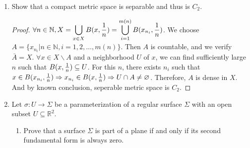 \documentclass{article}
\def\emptyset{\varnothing}
\begin{document}
\begin{enumerate}
\begin{proof}
\begin{enumerate}[label=(\alph*)]
Consider a rational point $p$ and a closed set $S$. Suppose $U\backslash A$ is an open neighborhood containing $p$, then all rational points within $U$ are in this set. Take an irrational number $q$ from $U$. For any open neighborhood $Y\backslash B$ containing $S$, $q\in Y$, where $Y$ is open in $\mathbb{R}$.  We can find a rational number within $Y$, sufficiently close to $q$ such that this rational number is also in $U$. Therefore $(U\backslash A)\cap (V\backslash B) \neq \emptyset$ and the topology defined in this problem is not $T_3$.
\item Let $\mathcal{N} = \{ \{x\}\cup B(x,{1\over n})\backslash S,n=1,2,\dots\}$. For a neighborhood $ U\backslash A $ of $ x $, we can find sufficiently large $n$ such that $B(x,{1\over n})\subseteq U \Rightarrow \{x\} \cup B(x,{1\over n})\backslash Q^c \subseteq U\backslash A $. Therefore, $(X,T)$ is $C_1$.
\item $\forall S_1\subset S,S_1 = S\cap (\mathbb{R}\backslash(S\backslash S_1))$ is open  in $S$. Thus $S$ has discrete topology. Each single point set is open. Therefore the accumulated point set of $A$ is empty. $\bar{A}=S\Rightarrow A=S$ and $A$ is uncountable. Hence $S$ cannot be separable. 
\item Assume $(X,T)$ is $C_2$, then $(S,T)$ is $C_2$. $C_2$ space is separable, a contradiction. 
\end{enumerate}
\end{proof}
\item Show that a compact metric space is separable and thus is $C_2$.
\begin{proof}
$\forall n\in \mathbb{N},X = \displaystyle\bigcup_{x\in X} B(x,{1\over n}) = \displaystyle\bigcup_{i=1}^{m(n)} B(x_{n_i},{1 \over n})$. We choose $A=\{x_{n_i}| n\in \mathbb{N},i=1,2,\dots,m(n)\}$. Then $A$ is countable, and we verify $\bar{A}=X$. $\forall x\in X\backslash A$ and a neighborhood $U$ of $x$, we can find sufficiently large $n$ such that $B(x,{1\over n})\subseteq U$. For this $n$, there exists $n_i$ such that 
$x \in B(x_{n_i},{1\over n})\Rightarrow x_{n_i}\in B(x,{1\over n})\Rightarrow U\cap A\neq \emptyset$. Therefore, $A$ is dense in $X$. And by known conclusion, seperable metric space is $C_2$.
\end{proof}
\item Let $\sigma: U\to \Sigma $ be a parameterization of a regular surface $\Sigma$ with an open subset $U\subseteq \mathbb{R}^2$.
\begin{enumerate}[label=(\arabic*)]
\item Prove that a surface $\Sigma$ is part of a plane if and only if its second fundamental form is always zero.

\end{enumerate}
\end{enumerate}
\end{document}
